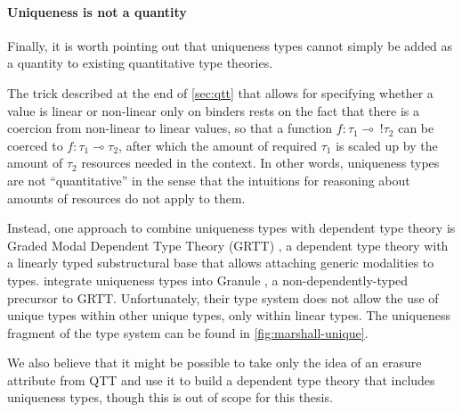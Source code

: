 \paragraph{Uniqueness is not a quantity} Finally, it is worth pointing out that uniqueness types cannot simply be added as a quantity to existing quantitative type theories. 

The trick described at the end of \cref{sec:qtt} that allows for specifying whether a value is linear or non-linear only on binders rests on the fact that there is a coercion from non-linear to linear values, so that a function $f : \tau_1 \multimap\ !\tau_2$ can be coerced to $f : \tau_1 \multimap \tau_2$, after which the amount of required $\tau_1$ is scaled up by the amount of $\tau_2$ resources needed in the context. In other words, uniqueness types are not ``quantitative'' in the sense that the intuitions for reasoning about amounts of resources do not apply to them.

Instead, one approach to combine uniqueness types with dependent type theory is Graded Modal Dependent Type Theory (GRTT) \citep{moon_graded_2021}, a dependent type theory with a linearly typed substructural base that allows attaching generic modalities to types. \cite{sergey_linearity_2022} integrate uniqueness types into Granule \citep{orchard_quantitative_2019}, a non-dependently-typed precursor to GRTT. Unfortunately, their type system does not allow the use of unique types within other unique types, only within linear types. The uniqueness fragment of the type system can be found in \cref{fig:marshall-unique}.

We also believe that it might be possible to take only the idea of an erasure attribute from QTT and use it to build a dependent type theory that includes uniqueness types, though this is out of scope for this thesis.

